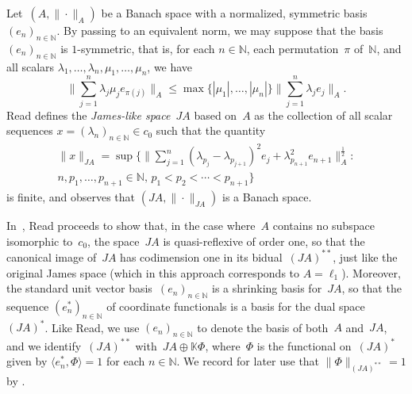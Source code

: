 \documentclass[12pt,reqno]{amsart}
\theoremstyle{definition}
\numberwithin{equation}{section}
\renewcommand{\le}{\ensuremath{\leqslant}}
\newcommand{\N}{\mathbb{N}}
\begin{document}
Let~$(A,\|\cdot\|_A)$ be a Banach space with a normalized, symmetric
basis~$(e_n)_{n\in\N}$. By passing to an equivalent
norm, we may suppose that the basis $(e_n)_{n\in\N}$ is
$1$-symmetric, that is, for each $n\in\N$, each
permutation~$\pi$ of~$\N$, and all scalars
$\lambda_1,\ldots,\lambda_n,\mu_1,\ldots,\mu_n$, we have
\[
\biggl\| \sum_{j=1}^n\lambda_j\mu_j e_{\pi(j)}\biggr\|_A\le\max\bigl\{
|\mu_1|,\ldots,|\mu_n|\bigr\}\biggl\| \sum_{j=1}^n\lambda_j
e_j\biggr\|_A. \] Read \cite[Definition~1.2(b)]{read} defines
the \emph{James-like space}~$JA$ based on~$A$ as the collection of all
scalar sequences $x = (\lambda_n)_{n\in\N}\in c_0$ such that the
quantity
\begin{multline*} \|x\|_{JA} = 
\sup\Biggl\{\biggl\|\sum_{j=1}^n(\lambda_{p_j}-\lambda_{p_{j+1}})^2e_j
+ \lambda_{p_{n+1}}^2e_{n+1}\biggr\|_A^{\frac{1}{2}}
:\\[-2ex] n,p_1,\ldots,p_{n+1}\in\N,\, p_1<p_2<\cdots<p_{n+1}\Biggr\}
\end{multline*}
is finite, and observes that $(JA,\|\cdot\|_{JA})$ is a Banach space. 

In~\cite[Section~2]{read}, Read proceeds to show that, in the case
where~$A$ contains no subspace isomorphic to~$c_0$, the space~$JA$ is
quasi-reflexive of order one, so that the canonical image of~$JA$ has
codimension one in its bidual~$(JA)^{**}$, just like the original
James space (which in this approach corresponds to $A =
\ell_1$). Moreover, the standard unit vector basis~$(e_n)_{n\in\N}$ is
a shrinking basis for~$JA$, so that the sequence $(e_n^*)_{n\in\N}$ of
coordinate functionals is a basis for the dual space~$(JA)^*$.  Like
Read, we use $(e_n)_{n\in\N}$ to denote the basis of both~$A$
and~$JA$, and we identify~$(JA)^{**}$ with~$JA\oplus\mathbb{K}\Phi$,
where~$\Phi$ is the functional on~$(JA)^*$ given by $\langle
e_n^*,\Phi\rangle = 1$ for each $n\in\N$. We record for later use that
$\|\Phi\|_{(JA)^{**}} =1$ by \cite[Lemma~2.2(a)]{read}.
\end{document}
